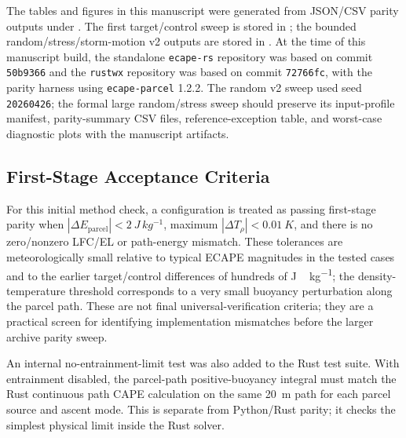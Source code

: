 \documentclass[11pt]{article}
\begin{document}
The tables and figures in this manuscript were generated from JSON/CSV parity outputs under . The first target/control sweep is stored in ; the bounded random/stress/storm-motion v2 outputs are stored in . At the time of this manuscript build, the standalone \texttt{ecape-rs} repository was based on commit \texttt{50b9366} and the \texttt{rustwx} repository was based on commit \texttt{72766fc}, with the parity harness using \texttt{ecape-parcel} 1.2.2. The random v2 sweep used seed \texttt{20260426}; the formal large random/stress sweep should preserve its input-profile manifest, parity-summary CSV files, reference-exception table, and worst-case diagnostic plots with the manuscript artifacts.

\subsection{First-Stage Acceptance Criteria}

For this initial method check, a configuration is treated as passing first-stage parity when $|\Delta E_{\mathrm{parcel}}| < \SI{2}{J\,kg^{-1}}$, maximum $|\Delta T_\rho| < \SI{0.01}{K}$, and there is no zero/nonzero LFC/EL or path-energy mismatch. These tolerances are meteorologically small relative to typical ECAPE magnitudes in the tested cases and to the earlier target/control differences of hundreds of \si{J\,kg^{-1}}; the density-temperature threshold corresponds to a very small buoyancy perturbation along the parcel path. These are not final universal-verification criteria; they are a practical screen for identifying implementation mismatches before the larger archive parity sweep.

An internal no-entrainment-limit test was also added to the Rust test suite. With entrainment disabled, the parcel-path positive-buoyancy integral must match the Rust continuous path CAPE calculation on the same \SI{20}{m} path for each parcel source and ascent mode. This is separate from Python/Rust parity; it checks the simplest physical limit inside the Rust solver.
\end{document}
